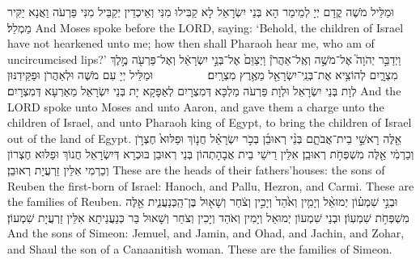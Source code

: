 {{{}}
{וּמַלֵּיל מֹשֶׁה קֳדָם יְיָ לְמֵימַר הָא בְּנֵי יִשְׂרָאֵל לָא קַבִּילוּ מִנִּי וְאֵיכְדֵין יְקַבֵּיל מִנִּי פַּרְעֹה וַאֲנָא יַקִּיר מַמְלַל׃}
{And Moses spoke before the LORD, saying: ‘Behold, the children of Israel have not hearkened unto me; how then shall Pharaoh hear me, who am of uncircumcised lips?’}{}
{וַיְדַבֵּ֣ר יְהֹוָה֮ אֶל־מֹשֶׁ֣ה וְאֶֽל־אַהֲרֹן֒ וַיְצַוֵּם֙ אֶל־בְּנֵ֣י יִשְׂרָאֵ֔ל וְאֶל־פַּרְעֹ֖ה מֶ֣לֶךְ מִצְרָ֑יִם לְהוֹצִ֥יא אֶת־בְּנֵֽי־יִשְׂרָאֵ֖ל מֵאֶ֥רֶץ מִצְרָֽיִם׃ \setuma         
}
{וּמַלֵּיל יְיָ עִם מֹשֶׁה וּלְאַהֲרֹן וּפַקֵּידִנּוּן לְוָת בְּנֵי יִשְׂרָאֵל וּלְוָת פַּרְעֹה מַלְכָּא דְּמִצְרָיִם לְאַפָּקָא יָת בְּנֵי יִשְׂרָאֵל מֵאַרְעָא דְּמִצְרָיִם׃}
{And the LORD spoke unto Moses and unto Aaron, and gave them a charge unto the children of Israel, and unto Pharaoh king of Egypt, to bring the children of Israel out of the land of Egypt.}{}
{אֵ֖לֶּה רָאשֵׁ֣י בֵית־אֲבֹתָ֑ם בְּנֵ֨י רְאוּבֵ֜ן בְּכֹ֣ר יִשְׂרָאֵ֗ל חֲנ֤וֹךְ וּפַלּוּא֙ חֶצְרֹ֣ן וְכַרְמִ֔י אֵ֖לֶּה מִשְׁפְּחֹ֥ת רְאוּבֵֽן׃
}
{אִלֵּין רֵישֵׁי בֵית אֲבָהָתְהוֹן בְּנֵי רְאוּבֵן בּוּכְרָא דְּיִשְׂרָאֵל חֲנוֹךְ וּפַלּוּא חֶצְרוֹן וְכַרְמִי אִלֵּין זַרְעֲיָת רְאוּבֵן׃}
{These are the heads of their fathers’houses: the sons of Reuben the first-born of Israel: Hanoch, and Pallu, Hezron, and Carmi. These are the families of Reuben.}{}
{וּבְנֵ֣י שִׁמְע֗וֹן יְמוּאֵ֨ל וְיָמִ֤ין וְאֹ֙הַד֙ וְיָכִ֣ין וְצֹ֔חַר וְשָׁא֖וּל בֶּן־הַֽכְּנַעֲנִ֑ית אֵ֖לֶּה מִשְׁפְּחֹ֥ת שִׁמְעֽוֹן׃}
{וּבְנֵי שִׁמְעוֹן יְמוּאֵל וְיָמִין וְאֹהַד וְיָכִין וְצֹחַר וְשָׁאוּל בַּר כְּנַעֲנֵיתָא אִלֵּין זַרְעֲיָת שִׁמְעוֹן׃}
{And the sons of Simeon: Jemuel, and Jamin, and Ohad, and Jachin, and Zohar, and Shaul the son of a Canaanitish woman. These are the families of Simeon.}{}
}
